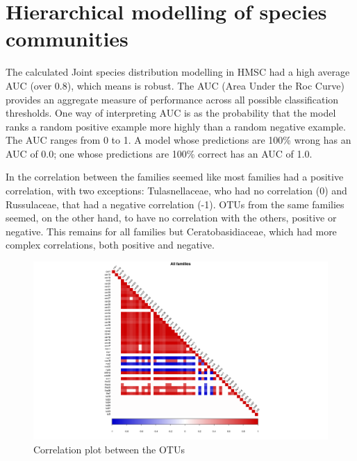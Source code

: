 \chapter{Hierarchical modelling of species communities}
\label{hierarchicalmodellingofspeciescommunities}

The calculated Joint species distribution modelling in HMSC had a high average AUC (over 0.8), which means is robust. The AUC (Area Under the Roc Curve) provides an aggregate measure of performance across all possible classification thresholds. One way of interpreting AUC is as the probability that the model ranks a random positive example more highly than a random negative example. The AUC ranges from 0 to 1. A model whose predictions are 100\% wrong has an AUC of 0.0; one whose predictions are 100\% correct has an AUC of 1.0.

In the correlation between the families seemed like most families had a positive correlation, with two exceptions: Tulasnellaceae, who had no correlation (0) and Russulaceae, that had a negative correlation (-1). OTUs from the same families seemed, on the other hand, to have no correlation with the others, positive or negative. This remains for all families but Ceratobasidiaceae, which had more complex correlations, both positive and negative.

\begin{figure}[htbp]
\centering
\includegraphics[keepaspectratio,width=\textwidth,height=0.75\textheight]{images/corrPlot.png}
\caption{Correlation plot between the OTUs}
\end{figure}

